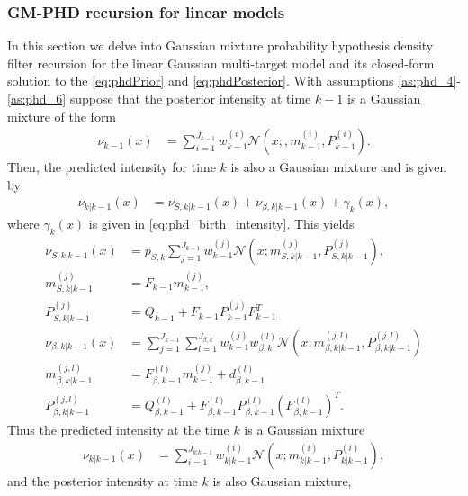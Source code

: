         \subsubsection{GM-PHD recursion for linear models}
In this section we delve into Gaussian mixture probability hypothesis density filter recursion for the linear Gaussian multi-target model and its closed-form solution to the \eqref{eq:phdPrior} and \eqref{eq:phdPosterior}. With assumptions \ref{as:phd_4}-\ref{as:phd_6} suppose that the posterior intensity at time $k-1$ is a Gaussian mixture of the form
\begin{align}
    \nu_{k-1}(x) &= \sum_{i=1}^{J_{k-1}} w_{k-1}^{(i)} \mathcal{N}(x;, m_{k-1}^{(i)}, P_{k-1}^{(i)}). \label{eq:phd_recursion_posterior}
\end{align}
Then, the predicted intensity for time $k$ is also a Gaussian mixture and is given by
\begin{align}
    \nu_{k|k-1}(x) &= \nu_{S,k|k-1}(x) + \nu_{\beta, k|k-1}(x) + \gamma_k(x),
    \label{eq:phd_recursion_predict}
\end{align}
where $\gamma_k(x)$ is given in \eqref{eq:phd_birth_intensity}. This yields
\begin{align}
    \nu_{S,k|k-1}(x) &= p_{S,k}\sum_{j=1}^{J_{k-1}}w_{k-1}^{(j)} \mathcal{N}(x;m_{S,k|k-1}^{(j)}, P_{S,k|k-1}^{(j)}) \label{eq:recursion_predict_intensity}, \\
    m_{S,k|k-1}^{(j)} &= F_{k-1}m_{k-1}^{(j)},  \label{eq:recursion_predict_m} \\
    P_{S,k|k-1}^{(j)} &= Q_{k-1} + F_{k-1}P_{k-1}^{(j)}F_{k-1}^T  \label{eq_recursion_predict_P} \\
    \nu_{\beta,k|k-1}(x) &= \sum_{j=1}^{J_{k-1}} \sum_{l=1}^{J_{\beta,k}} w_{k-1}^{(j)} w_{\beta,k}^{(l)} \mathcal{N}(x;m_{\beta,k|k-1}^{(j, l)},P_{\beta,k|k-1}^{(j,l)}) \\
    m_{\beta,k|k-1}^{(j, l)} &= F_{\beta,k-1}^{(l)} m_{k-1}^{(j)} + d_{\beta,k-1}^{(l)} \\
    P_{\beta,k|k-1}^{(j, l)} &= Q_{\beta,k-1}^{(l)} + F_{\beta,k-1}^{(l)} P_{\beta,k-1}^{(l)} (F_{\beta,k-1}^{(l)})^T.
\end{align}
Thus the predicted intensity at the time $k$ is a Gaussian mixture
\begin{align}
    \nu_{k|k-1}(x) &= \sum_{i=1}^{J_{k|k-1}}w_{k|k-1}^{(i)} \mathcal{N}(x;m_{k|k-1}^{(i)}, P_{k|k-1}^{(i)}),  \label{eq:recursion_predict_intensity2}
\end{align}
and the posterior intensity at time $k$ is also Gaussian mixture,
